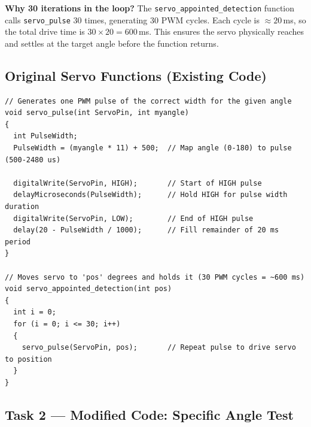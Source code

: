 \documentclass[12pt,a4paper]{article}
\begin{document}
\textbf{Why 30 iterations in the loop?} The \texttt{servo\_appointed\_detection}
function calls \texttt{servo\_pulse} 30 times, generating 30 PWM cycles.
Each cycle is $\approx 20$\,ms, so the total drive time is $30 \times 20 = 600$\,ms.
This ensures the servo physically reaches and settles at the target angle before
the function returns.

\subsection{Original Servo Functions (Existing Code)}

\begin{lstlisting}[style=arduino,caption={Original servo\_pulse and servo\_appointed\_detection}]
// Generates one PWM pulse of the correct width for the given angle
void servo_pulse(int ServoPin, int myangle)
{
  int PulseWidth;
  PulseWidth = (myangle * 11) + 500;  // Map angle (0-180) to pulse (500-2480 us)

  digitalWrite(ServoPin, HIGH);       // Start of HIGH pulse
  delayMicroseconds(PulseWidth);      // Hold HIGH for pulse width duration
  digitalWrite(ServoPin, LOW);        // End of HIGH pulse
  delay(20 - PulseWidth / 1000);      // Fill remainder of 20 ms period
}

// Moves servo to 'pos' degrees and holds it (30 PWM cycles = ~600 ms)
void servo_appointed_detection(int pos)
{
  int i = 0;
  for (i = 0; i <= 30; i++)
  {
    servo_pulse(ServoPin, pos);       // Repeat pulse to drive servo to position
  }
}
\end{lstlisting}

\subsection{Task 2 --- Modified Code: Specific Angle Test}
\end{document}
